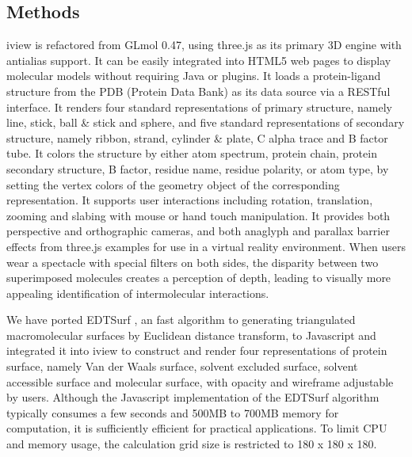 \documentclass{bioinfo}
\begin{document}
\begin{methods}
\section{Methods}

iview is refactored from GLmol 0.47, using three.js as its primary 3D engine with antialias support. It can be easily integrated into HTML5 web pages to display molecular models without requiring Java or plugins. It loads a protein-ligand structure from the PDB (Protein Data Bank) \citep{539,537} as its data source via a RESTful interface. It renders four standard representations of primary structure, namely line, stick, ball \& stick and sphere, and five standard representations of secondary structure, namely ribbon, strand, cylinder \& plate, C alpha trace and B factor tube. It colors the structure by either atom spectrum, protein chain, protein secondary structure, B factor, residue name, residue polarity, or atom type, by setting the vertex colors of the geometry object of the corresponding representation. It supports user interactions including rotation, translation, zooming and slabing with mouse or hand touch manipulation. It provides both perspective and orthographic cameras, and both anaglyph and parallax barrier effects from three.js examples for use in a virtual reality environment. When users wear a spectacle with special filters on both sides, the disparity between two superimposed molecules creates a perception of depth, leading to visually more appealing identification of intermolecular interactions.

We have ported EDTSurf \citep{1297}, an fast algorithm to generating triangulated macromolecular surfaces by Euclidean distance transform, to Javascript and integrated it into iview to construct and render four representations of protein surface, namely Van der Waals surface, solvent excluded surface, solvent accessible surface and molecular surface, with opacity and wireframe adjustable by users. Although the Javascript implementation of the EDTSurf algorithm typically consumes a few seconds and 500MB to 700MB memory for computation, it is sufficiently efficient for practical applications. To limit CPU and memory usage, the calculation grid size is restricted to 180 x 180 x 180.


\end{methods}
\end{document}
